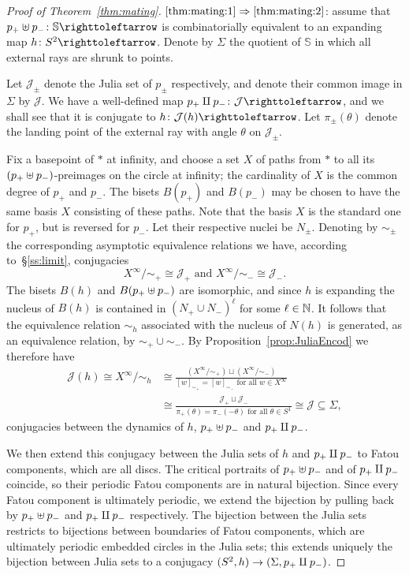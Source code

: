\documentclass{amsart}
\newcommand\Julia{{\mathcal J}}
\begin{document}
\begin{proof}[Proof of Theorem~\ref{thm:mating}]
  $\eqref{thm:mating:1}\Rightarrow\eqref{thm:mating:2}$: assume that
  $p_+\FM p_-\colon\mathbb S\selfmap$ is combinatorially equivalent to
  an expanding map $h\colon S^2\selfmap$. Denote by $\Sigma$ the quotient
  of $\mathbb S$ in which all external rays are shrunk to points.

  Let $\Julia_\pm$ denote the Julia set of $p_\pm$ respectively, and
  denote their common image in $\Sigma$ by $\Julia$. We have a
  well-defined map $p_+\GM p_-\colon\Julia\selfmap$, and we shall see
  that it is conjugate to $h\colon\Julia(h)\selfmap$. Let
  $\pi_\pm(\theta)$ denote the landing point of the external ray with
  angle $\theta$ on $\Julia_\pm$.

  Fix a basepoint of $*$ at infinity, and choose a set $X$ of paths
  from $*$ to all its $(p_+\uplus p_-)$-preimages on the circle at
  infinity; the cardinality of $X$ is the common degree of $p_+$ and
  $p_-$. The bisets $B(p_+)$ and $B(p_-)$ may be chosen to have the
  same basis $X$ consisting of these paths. Note that the basis $X$ is
  the standard one for $p_+$, but is reversed for $p_-$.  Let their
  respective nuclei be $N_\pm$. Denoting by $\sim_\pm$ the
  corresponding asymptotic equivalence relations we have, according
  to~\S\ref{ss:limit}, conjugacies
  \[X^\infty/{\sim_+}\cong\Julia_+\text{ and }X^\infty/{\sim_-}\cong\Julia_-.
  \]
  The bisets $B(h)$ and $B(p_+\uplus p_-)$ are isomorphic, and since $h$
  is expanding the nucleus of $B(h)$ is contained in
  $(N_+\cup N_-)^\ell$ for some $\ell\in{\mathbb N}$. It follows that the
  equivalence relation $\sim_h$ associated with the nucleus of $N(h)$
  is generated, as an equivalence relation, by
  ${\sim_+}\cup{\sim_-}$. By Proposition~\ref{prop:JuliaEncod} we therefore have
  \begin{align*}
    \Julia(h)\cong X^\infty/{\sim_h} &\cong\frac{(X^\infty/{\sim_+})\sqcup(X^\infty/{\sim_-})}{[w]_{\sim_+}=[w]_{\sim_-}\text{ for all }w\in X^\infty}\\
    &\cong\frac{\Julia_+\sqcup\Julia_-}{\pi_+(\theta)=\pi_-(-\theta)\text{ for all }\theta\in S^1}\cong\Julia\subseteq \Sigma,
  \end{align*}
  conjugacies between the dynamics of $h$, $p_+\uplus p_-$ and
  $p_+\amalg p_-$.

  We then extend this conjugacy between the Julia sets of $h$ and
  $p_+\amalg p_-$ to Fatou components, which are all discs. The critical
  portraits of $p_+\uplus p_-$ and of $p_+\amalg p_-$ coincide, so their
  periodic Fatou components are in natural bijection. Since every
  Fatou component is ultimately periodic, we extend the bijection by
  pulling back by $p_+\uplus p_-$ and $p_+\amalg p_-$ respectively. The
  bijection between the Julia sets restricts to bijections between
  boundaries of Fatou components, which are ultimately periodic
  embedded circles in the Julia sets; this extends uniquely the
  bijection between Julia sets to a conjugacy
  $(S^2,h)\to(\Sigma,p_+\amalg p_-)$.


\end{proof}
\end{document}
